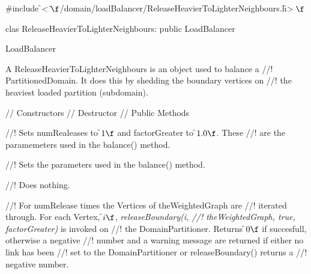 
\indent \#include \f$<\tilde{
}\f$/domain/loadBalancer/ReleaseHeavierToLighterNeighbours.h\f$>\f$ 

\indent clas ReleaseHeavierToLighterNeighbours: public LoadBalancer

\indent  LoadBalancer
\indent{}


\indent A ReleaseHeavierToLighterNeighbours is an object used to balance a
//! PartitionedDomain. It does this by shedding the boundary vertices on
//! the heaviest loaded partition (subdomain).

\indent\indent  // Constructors
\indent{} 
\indent{} 
\indent\indent // Destructor
\indent{}
\indent\indent // Public Methods
\indent{}


//! Sets \p numRealeases to \f$1\f$ and \p factorGreater to \f$1.0\f$. These
//! are the paramemeters used in the balance() method.

//! Sets the parameters used in the balance() method.

//! Does nothing.

//! For \p numRelease times the Vertices of \p theWeightedGraph are
//! iterated through. For each Vertex, \f$i\f$, {\em releaseBoundary(i,
//! theWeightedGraph, true, factorGreater)} is invoked on
//! the DomainPartitioner. Returns \f$0\f$ if succesfull, otherwise a negative
//! number and a warning message are returned if either no link has been
//! set to the DomainPartitioner or releaseBoundary() returns a
//! negative number. 



